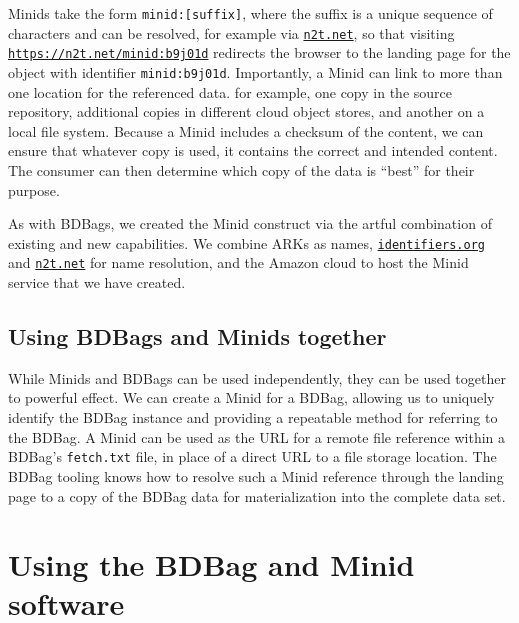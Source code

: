 \documentclass[11pt]{article}
\begin{document}
Minids  take the form \texttt{minid:[suffix]}, where  the suffix is a unique sequence of characters
and can be resolved, for example via \texttt{\href{https://n2t.net}{n2t.net}},
so that visiting
\texttt{\href{https://n2t.net/minid:b9j01d}{https://n2t.net/minid:b9j01d}} 
redirects the browser to the landing page for the
object with identifier \texttt{minid:b9j01d}.
Importantly, a Minid can link to more than one location for the referenced data.
for example, one copy in the source repository, 
additional copies in different cloud object stores, and another on a local file system.
Because a Minid includes a checksum of the content, 
we can ensure that whatever copy is used, it contains the correct and intended content.
The consumer can then determine which copy of the data is ``best'' for their purpose.

As with BDBags, we created the Minid construct via the artful combination of existing and new capabilities.
We combine ARKs as names, 
\texttt{\href{https://identifiers.org}{identifiers.org}} and \texttt{\href{https://n2t.net}{n2t.net}} for name resolution,
and the Amazon cloud to host the Minid service that we have created. 


\subsection{Using BDBags and Minids together} 

While Minids and BDBags can be used independently, they can be used together to powerful effect. 
We can create a Minid for a BDBag, 
allowing us to uniquely identify the BDBag instance and providing a repeatable method for referring to the BDBag. 
A Minid can be used as the URL for a remote file reference within a BDBag's \texttt{fetch.txt} file,
in place of a direct URL to a file storage location.  
The BDBag tooling knows how to resolve such a Minid reference
through the landing page to a copy of the BDBag data
for materialization into the complete data set.  



\section{Using the BDBag and Minid software}
\end{document}
